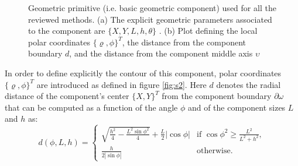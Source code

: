 \begin{figure}[!ht]
\caption{Geometric primitive (i.e. basic geometric component) used for all the reviewed methods. (a) The explicit geometric parameters associated to the component are $\lbrace X,Y,L,h,\theta \rbrace$ . (b)  Plot defining the local polar coordinates  $\lbrace \varrho,\phi \rbrace^T$, the distance from the component boundary $d$, and the distance from the component middle axis $\upsilon$  } 
\end{figure}
In order to define explicitly the contour of this component, polar coordinates $\lbrace \varrho,\phi \rbrace^T$ are introduced as defined in figure \ref{fig:s2}.
Here $d$ denotes the radial distance of the component's center $\{X,Y\}^T$ from the component boundary $\partial \omega$ that can be computed as a function of the angle $\phi$ and of the component sizes $L$ and $h$ as:
\begin{equation}
    d(\phi,L,h) = \begin{cases}
              \sqrt{\frac{h^2}{4}-\frac{L^2\sin{\phi}^2}{4}}+\frac{L}{2}|\cos{\phi}| & \text{if } \cos{\phi}^2\geq \frac{L^2}{L^2+h^2},\\
               \frac{h}{2|\sin{\phi}|} & \text{otherwise}.
          \end{cases}
\end{equation}
